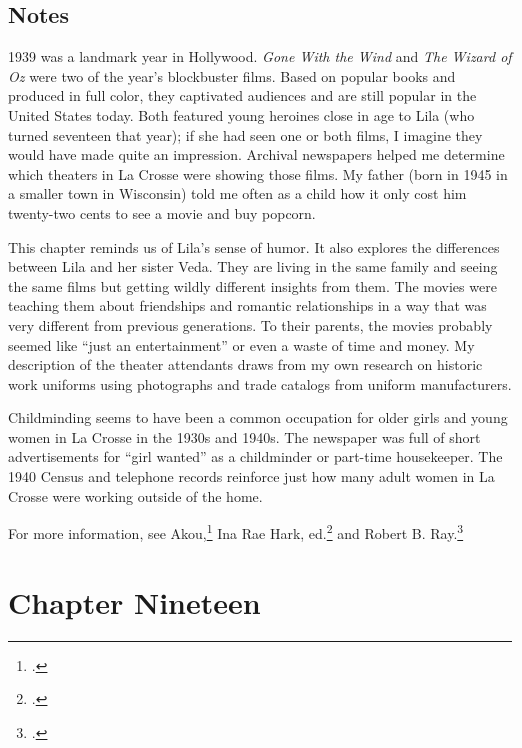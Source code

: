 \documentclass[
  american,
  letterpaper,
]{book}
\begin{document}
\section{Notes}\label{notes-19}

1939 was a landmark year in Hollywood. \emph{Gone With the Wind} and
\emph{The Wizard of Oz} were two of the year's blockbuster films. Based
on popular books and produced in full color, they captivated audiences
and are still popular in the United States today. Both featured young
heroines close in age to Lila (who turned seventeen that year); if she
had seen one or both films, I imagine they would have made quite an
impression. Archival newspapers helped me determine which theaters in La
Crosse were showing those films. My father (born in 1945 in a smaller
town in Wisconsin) told me often as a child how it only cost him
twenty-two cents to see a movie and buy popcorn.

This chapter reminds us of Lila's sense of humor. It also explores the
differences between Lila and her sister Veda. They are living in the
same family and seeing the same films but getting wildly different
insights from them. The movies were teaching them about friendships and
romantic relationships in a way that was very different from previous
generations. To their parents, the movies probably seemed like ``just an
entertainment'' or even a waste of time and money. My description of the
theater attendants draws from my own research on historic work uniforms
using photographs and trade catalogs from uniform manufacturers.

Childminding seems to have been a common occupation for older girls and
young women in La Crosse in the 1930s and 1940s. The newspaper was full
of short advertisements for ``girl wanted'' as a childminder or
part-time housekeeper. The 1940 Census and telephone records reinforce
just how many adult women in La Crosse were working outside of the home.

For more information, see Akou,\footnote{.} Ina Rae Hark, ed.\footnote{.} and Robert B.
Ray.\footnote{.}


\chapter{Chapter Nineteen}\label{chapter-nineteen}
\end{document}
